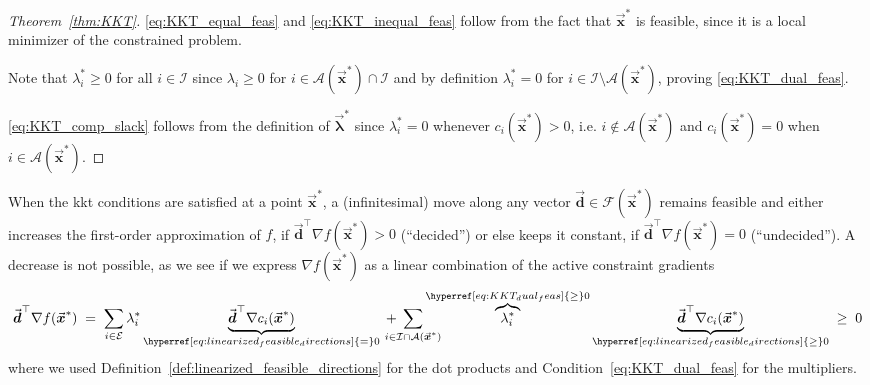 \documentclass[9pt, headings=standardclasses, parskip=half]{scrartcl}
\newcommand{\vect}[1]{\vec{\boldsymbol{#1}}}
\begin{document}
\begin{proof}[Theorem~\ref{thm:KKT}]
  \eqref{eq:KKT_equal_feas} and \eqref{eq:KKT_inequal_feas} follow from the fact that \(\vect{x}^{\ast}\) is feasible, since it is a local minimizer of the constrained problem.
  
  Note that \(\lambda_{i}^{\ast} \ge 0\) for all \(i\in\mathcal{I}\) since \(\lambda_{i} \ge 0\) for \(i\in\mathcal{A}(\vect{x}^{\ast}) \cap \mathcal{I}\) and by definition \(\lambda_{i}^{\ast} = 0\) for \(i\in\mathcal{I} \setminus \mathcal{A}(\vect{x}^{\ast})\), proving \eqref{eq:KKT_dual_feas}.

  \eqref{eq:KKT_comp_slack} follows from the definition of \(\vect{\lambda}^{\ast}\) since \(\lambda_{i}^{\ast} = 0\) whenever \(c_{i}(\vect{x}^{\ast}) > 0\), i.e. \(i \notin \mathcal{A}(\vect{x}^{\ast})\) and \(c_{i}(\vect{x}^{\ast}) = 0\) when \(i \in \mathcal{A}(\vect{x}^{\ast})\).
\end{proof}


When the \gls{kkt} conditions are satisfied at a point \(\vect{x}^{\ast}\), a (infinitesimal) move along any vector \(\vect{d} \in \mathcal{F}(\vect{x}^{\ast})\) remains feasible and either increases the first-order approximation of \(f\), if \(\vect{d}^\top \nabla f(\vect{x}^{\ast}) > 0\) (``decided'') or else keeps it constant, if \(\vect{d}^\top \nabla f(\vect{x}^{\ast}) = 0\) (``undecided'').
A decrease is not possible, as we see if we express \(\nabla f(\vect{x}^{\ast})\) as a linear combination of the active constraint gradients
\newcommand{\linkeq}[1]{\mathrel{\hyperref[#1]{=}}}   %
\newcommand{\linkge}[1]{\mathrel{\hyperref[#1]{\ge}}} %
\begin{equation}\label{eq:KKT_objective_gradient}
\vect{d}^{\top}\nabla f(\vect{x}^{\ast})
\;=\;
\sum_{i\in\mathcal{E}}
\lambda_i^{\ast}
\underbrace{\vect{d}^{\top}\nabla c_i(\vect{x}^{\ast})}_{\linkeq{eq:linearized_feasible_directions}0}
\;+\;
\sum_{\mathclap{i\in\mathcal{I}\cap\mathcal{A}(\vect{x}^{\ast})}}
\overbrace{\lambda_i^{\ast}}^{\linkge{eq:KKT_dual_feas}0}
\underbrace{\vect{d}^{\top}\nabla c_i(\vect{x}^{\ast})}_{\linkge{eq:linearized_feasible_directions}0}
\;\ge\;
0
\end{equation}
where we used Definition~\ref{def:linearized_feasible_directions} for the dot products and Condition~\eqref{eq:KKT_dual_feas} for the multipliers.
\end{document}
